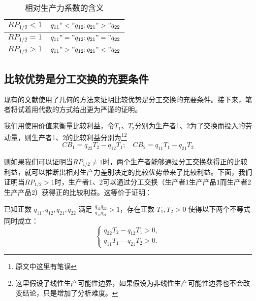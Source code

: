 \begin{table}
    \centering
    \caption{相对生产力系数的含义\cite[48-49]{CaiJiMingCongXiaYiJieZhiLunDaoGuangYiJieZhiLunXiuDingBan2022}}
    \label{table:RP_{1/2}}
    \begin{tabular}{|l|l|}
    \hline
        $\mathit{RP}_{1/2}<1$ & $q_{11} \quad "<" \quad q_{12}; \quad q_{21} \quad ">" \quad q_{22}$ \\ \hline
        $\mathit{RP}_{1/2}=1$ & $q_{11} \quad "=" \quad q_{12}; \quad q_{21} \quad "=" \quad q_{22}$ \\ \hline
        $\mathit{RP}_{1/2}>1$ & $q_{11} \quad ">" \quad q_{12}; \quad q_{21} \quad "<" \quad q_{22}$ \\ \hline
    \end{tabular}
\end{table}

\subsection{比较优势是分工交换的充要条件}

现有的文献使用了几何的方法来证明比较优势是分工交换的充要条件。接下来，笔者将试着用代数的方式给出更为严谨的证明。

我们用使用价值来衡量比较利益\cite[63]{CaiJiMingGuangYiJieZhiLun2001}，令$T_1$、$T_2$分别为生产者1、2为了交换而投入的劳动量，则生产者1、2的比较利益分别为\footnote{原文中这里有笔误}\footnote{这里假设了线性生产可能性边界，如果假设为非线性生产可能性边界也不会改变结论，只是增加了分析难度\cite[285]{LiRenJunJieZhiLiLun2004}。}
\begin{equation}
    \mathit{CB}_1 = q_{22}T_2 - q_{12}T_1 ; \quad \mathit{CB}_2 = q_{11}T_1 - q_{21}T_2  
\end{equation}

则如果我们可以证明当$RP_{1/2} \neq 1$时，两个生产者能够通过分工交换获得正的比较利益，就可以推断出相对生产力差别决定的比较优势带来了比较利益。下面，我们证明当$RP_{1/2} > 1$时，生产者1、2可以通过分工交换（生产者1生产产品1而生产者2生产产品2）获得正的比较利益。这等价于证明：

\begin{proposition}
    已知正数 $ q_{11}, q_{12}, q_{21}, q_{22} $ 满足 $\frac{q_{11}q_{22}}{q_{12}q_{21}} > 1$，存在正数 $T_1,T_2 > 0$ 使得以下两个不等式同时成立：
    $$
        \begin{cases}
            q_{22}T_2 - q_{12}T_1 > 0, \\
            q_{11}T_1 - q_{21}T_2 > 0.
        \end{cases}
    $$    
\end{proposition}

